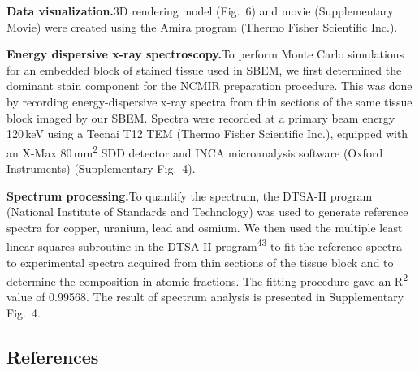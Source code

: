 \documentclass{article}
\newcommand{\cit}[1]{\textsuperscript{#1}}
\begin{document}
\medskip
\noindent\textbf{Data visualization.}\quad 3D rendering model (Fig.~6) and movie (Supplementary Movie) were created using the Amira program (Thermo Fisher Scientific Inc.).

\medskip
\noindent\textbf{Energy dispersive x-ray spectroscopy.}\quad To perform Monte Carlo simulations for an embedded block of stained tissue used in SBEM, we first determined the dominant stain component for the NCMIR preparation procedure. This was done by recording energy-dispersive x-ray spectra from thin sections of the same tissue block imaged by our SBEM. Spectra were recorded at a primary beam energy 120\,keV using a Tecnai T12 TEM (Thermo Fisher Scientific Inc.), equipped with an X-Max 80\,mm\textsuperscript{2} SDD detector and INCA microanalysis software (Oxford Instruments) (Supplementary Fig.~4).

\medskip
\noindent\textbf{Spectrum processing.}\quad To quantify the spectrum, the DTSA-II program (National Institute of Standards and Technology) was used to generate reference spectra for copper, uranium, lead and osmium. We then used the multiple least linear squares subroutine in the DTSA-II program\cit{43} to fit the reference spectra to experimental spectra acquired from thin sections of the tissue block and to determine the composition in atomic fractions. The fitting procedure gave an R\textsuperscript{2} value of 0.99568. The result of spectrum analysis is presented in Supplementary Fig.~4.

\subsection*{References}
\end{document}
